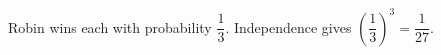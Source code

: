Robin wins each with probability $\dfrac{1}{3}$. Independence gives $(\dfrac{1}{3})^3=\boxed{\dfrac{1}{27}}$.
